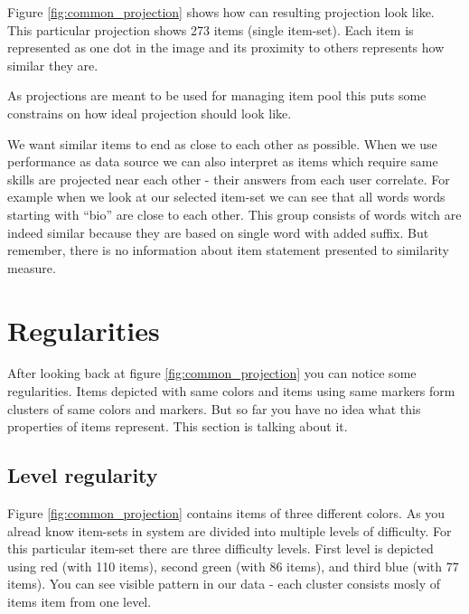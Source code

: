 \documentclass[
  digital, %
  table,   %
  nolof,     %
  nolot,     %
  nocover
]{fithesis3}
\begin{document}
Figure \ref{fig:common_projection} shows how can resulting projection look like. This particular projection shows 273 items (single item-set). Each item is represented as one dot in the image and its proximity to others represents how similar they are.


As projections are meant to be used for managing item pool this puts some constrains on how ideal projection should look like.

We want similar items to end as close to each other as possible. When we use performance as data source we can also interpret as items which require same skills are projected near each other - their answers from each user correlate. For example when we look at our selected item-set we can see that all words words starting with ``bio'' are close to each other. This group consists of words witch are indeed similar because they are based on single word with added suffix. But remember, there is no information about item statement presented to similarity measure.


\section{Regularities}\label{regularities}


After looking back at figure \ref{fig:common_projection} you can notice some regularities. Items depicted with same colors and items using same markers form clusters of same colors and markers. But so far you have no idea what this properties of items represent. This section is talking about it.

\subsection{Level regularity}\label{regularities-level-regularity}


Figure \ref{fig:common_projection} contains items of three different colors. As you alread know item-sets in system \umimeCesky{} are divided into multiple levels of difficulty. For this particular item-set there are three difficulty levels. First level is depicted using red (with 110 items), second green (with 86 items), and third blue (with 77 items). You can see visible pattern in our data - each cluster consists mosly of items item from one level.
\end{document}

